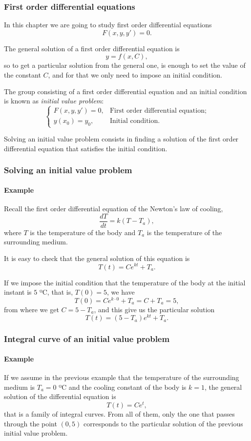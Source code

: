 \begin{frame}
\frametitle{First order differential equations}
In this chapter we are going to study first order differential equations
\[
F(x,y,y')=0.
\]

The general solution of a first order differential equation is
\[
y = f (x,C),
\]
so to get a particular solution from the general one, is enough to set the value of the constant $C$, and for that we only need to impose an initial condition.

\begin{definition}
The group consisting of a first order differential equation and an initial condition is known as \emph{initial value problem}:
\[
\begin{cases}
F(x,y,y')=0, & \mbox{First order differential equation;} \\
y(x_0)=y_0, & \mbox{Initial condition.}
\end{cases}
\]
\end{definition}

Solving an initial value problem consists in finding a solution of the first order differential equation that satisfies the initial condition.
\end{frame}


\begin{frame}
\frametitle{Solving an initial value problem}
\framesubtitle{Example}
Recall the first order differential equation of the Newton's law of cooling,
\[
\frac{dT}{dt}=k(T-T_a),
\]
where $T$ is the temperature of the body and $T_a$ is the temperature of the surrounding medium.

It is easy to check that the general solution of this equation is 
\[T(t) = Ce^{kt}+T_a.\]

If we impose the initial condition that the temperature of the body at the initial instant is $5$ ºC, that is, $T(0)=5$, we have
\[T(0) = Ce^{k\cdot0}+T_a = C+T_a = 5,\]
from where we get $C=5-T_a$, and this give us the particular solution
\[
T(t) = (5-T_a)e^{kt}+T_a.
\]
\end{frame}


\begin{frame}
\frametitle{Integral curve of an initial value problem}
\framesubtitle{Example}
If we assume in the previous example that the temperature of the surrounding medium is $T_a=0$ ºC and the cooling constant of the body is $k=1$, the general solution of the differential equation is
\[T(t)=Ce^t,\]
that is a family of integral curves.
From all of them, only the one that passes through the point $(0,5)$ corresponds to the particular solution of the previous initial value problem. 
\begin{center}

\end{center}
\end{frame}


